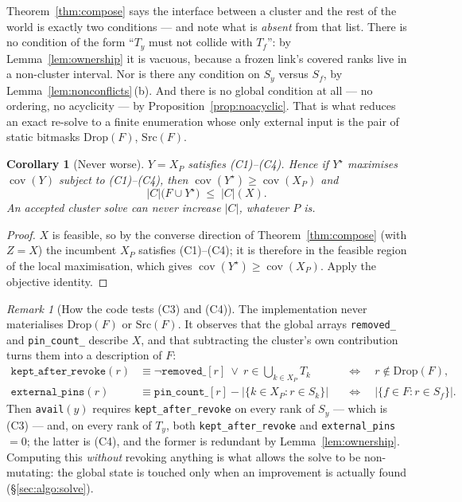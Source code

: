 \documentclass[11pt,a4paper]{article}
\theoremstyle{definition}
\theoremstyle{plain}
\newtheorem{corollary}[theorem]{Corollary}
\theoremstyle{remark}
\newtheorem{remark}{Remark}
\newcommand{\cov}{\operatorname{cov}}
\begin{document}
Theorem~\ref{thm:compose} says the interface between a cluster and the
rest of the world is exactly two conditions --- and note what is
\emph{absent} from that list. There is no condition of the form
``$T_y$ must not collide with $T_f$'': by Lemma~\ref{lem:ownership} it is
vacuous, because a frozen link's covered ranks live in a non-cluster
interval. Nor is there any condition on $S_y$ versus $S_f$, by
Lemma~\ref{lem:nonconflicts}\,(b). And there is no global condition at
all --- no ordering, no acyclicity --- by Proposition~\ref{prop:noacyclic}.
That is what reduces an exact re-solve to a finite enumeration whose
only external input is the pair of static bitmasks
$\mathrm{Drop}(F)$, $\mathrm{Src}(F)$.

\begin{corollary}[Never worse]
\label{cor:neverworse}
$Y = X_P$ satisfies (C1)--(C4). Hence if $Y^\star$ maximises $\cov(Y)$
subject to (C1)--(C4), then $\cov(Y^\star) \ge \cov(X_P)$ and
\[
  |C|\bigl(F \cup Y^\star\bigr) \;\le\; |C|(X).
\]
An accepted cluster solve can never increase $|C|$, whatever $P$ is.
\end{corollary}

\begin{proof}
$X$ is feasible, so by the converse direction of
Theorem~\ref{thm:compose} (with $Z = X$) the incumbent $X_P$ satisfies
(C1)--(C4); it is therefore in the feasible region of the local
maximisation, which gives $\cov(Y^\star) \ge \cov(X_P)$. Apply the
objective identity.
\end{proof}

\begin{remark}[How the code tests (C3) and (C4)]
\label{rem:avail}
The implementation never materialises $\mathrm{Drop}(F)$ or
$\mathrm{Src}(F)$. It observes that the global arrays
\texttt{removed\_} and \texttt{pin\_count\_} describe $X$, and that
subtracting the cluster's own contribution turns them into a description
of $F$:
\[
\begin{aligned}
  \texttt{kept\_after\_revoke}(r) &\equiv
    \neg\texttt{removed\_}[r] \ \vee\ r \in \textstyle\bigcup_{k \in X_P} T_k
    &&\Longleftrightarrow\quad r \notin \mathrm{Drop}(F), \\
  \texttt{external\_pins}(r) &\equiv
    \texttt{pin\_count\_}[r] - \bigl|\{k \in X_P : r \in S_k\}\bigr|
    &&\Longleftrightarrow\quad
    \bigl|\{f \in F : r \in S_f\}\bigr| .
\end{aligned}
\]
Then \texttt{avail}$(y)$ requires \texttt{kept\_after\_revoke} on every
rank of $S_y$ --- which is (C3) --- and, on every rank of $T_y$, both
\texttt{kept\_after\_revoke} and \texttt{external\_pins} $= 0$; the
latter is (C4), and the former is redundant by
Lemma~\ref{lem:ownership}. Computing this \emph{without} revoking
anything is what allows the solve to be non-mutating: the global state is
touched only when an improvement is actually found
(\S\ref{sec:algo:solve}).
\end{remark}
\end{document}
